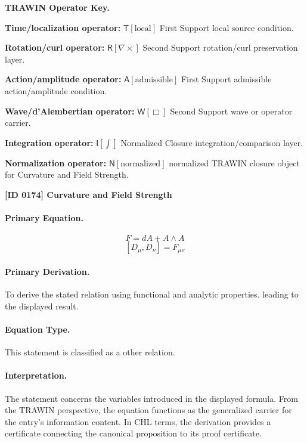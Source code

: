 \par\vspace{0.45\baselineskip}
\noindent\begin{minipage}[t]{\linewidth}
\begingroup
\small
\raggedright
\textbf{TRAWIN Operator Key.}\par
\noindent\textbf{Time/localization operator:} $\mathsf{T}\!\left[\mathrm{local}\right]$ First Support local source condition.\par
\noindent\textbf{Rotation/curl operator:} $\mathsf{R}\!\left[\nabla\times\right]$ Second Support rotation/curl preservation layer.\par
\noindent\textbf{Action/amplitude operator:} $\mathsf{A}\!\left[\mathrm{admissible}\right]$ First Support admissible action/amplitude condition.\par
\noindent\textbf{Wave/d'Alembertian operator:} $\mathsf{W}\!\left[\Box\right]$ Second Support wave or operator carrier.\par
\noindent\textbf{Integration operator:} $\mathsf{I}\!\left[\int\right]$ Normalized Closure integration/comparison layer.\par
\noindent\textbf{Normalization operator:} $\mathsf{N}\!\left[\mathrm{normalized}\right]$ normalized TRAWIN closure object for Curvature and Field Strength.\par
\endgroup
\end{minipage}

\clearpage
\noindent\textbf{[ID 0174] Curvature and Field Strength}\par
\vspace{0.35em}
\paragraph{Primary Equation.}
\[
F = dA + A\wedge A
\]
\[
[D_\mu, D_\nu] = F_{\mu\nu}
\]

\paragraph{Primary Derivation.}
To derive the stated relation using functional and analytic properties. leading to the displayed result.
\paragraph{Equation Type.}
This statement is classified as a other relation.

\paragraph{Interpretation.}
The statement concerns the variables introduced in the displayed formula. From the TRAWIN perspective, the equation functions as the generalized carrier for the entry’s information content. In CHL terms, the derivation provides a certificate connecting the canonical proposition to its proof certificate.

